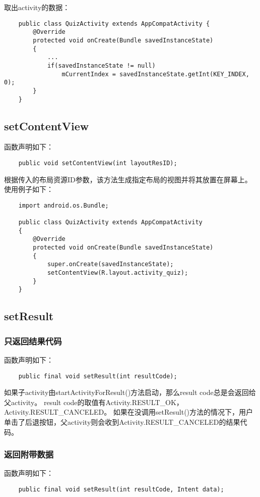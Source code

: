 \documentclass[a4paper,left=2.5cm,right=2.5cm,11pt]{article}
\begin{document}
	取出activity的数据：
	\begin{lstlisting}
	public class QuizActivity extends AppCompatActivity {
		@Override
		protected void onCreate(Bundle savedInstanceState)
		{
			...
			if(savedInstanceState != null)
				mCurrentIndex = savedInstanceState.getInt(KEY_INDEX, 0);
		}
	}
	\end{lstlisting}

\subsection{setContentView}
	函数声明如下：
	\begin{lstlisting}
	public void setContentView(int layoutResID);
	\end{lstlisting}

	根据传入的布局资源ID参数，该方法生成指定布局的视图并将其放置在屏幕上。使用例子如下：
	\begin{lstlisting}
	import android.os.Bundle;
	
	public class QuizActivity extends AppCompatActivity
	{
		@Override
		protected void onCreate(Bundle savedInstanceState)
		{
			super.onCreate(savedInstanceState);
			setContentView(R.layout.activity_quiz);
		}
	}
	\end{lstlisting}

\subsection{setResult}
\subsubsection{只返回结果代码}
	函数声明如下：
	\begin{lstlisting}
	public final void setResult(int resultCode);
	\end{lstlisting}

	如果子activity由startActivityForResult()方法启动，那么result code总是会返回给父activity。
	result code的取值有Activity.RESULT\_OK，Activity.RESULT\_CANCELED。
	如果在没调用setResult()方法的情况下，用户单击了后退按钮，父activity则会收到Activity.RESULT\_CANCELED的结果代码。

\subsubsection{返回附带数据}
	函数声明如下：
	\begin{lstlisting}
	public final void setResult(int resultCode, Intent data);
	\end{lstlisting}
\end{document}
